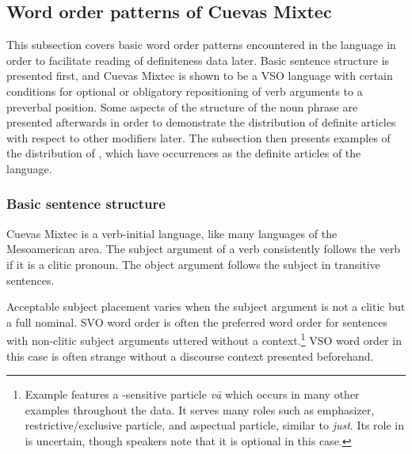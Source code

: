 \documentclass[output=paper,modfonts,nonflat]{langsci/langscibook}
\begin{document}
\subsection{Word order patterns of Cuevas Mixtec} \label{sec:cisneros:3.3}

This subsection covers basic word order patterns encountered in the language in order to facilitate reading of definiteness data later.  Basic sentence structure is presented first, and Cuevas Mixtec is shown to be a VSO language with certain conditions for optional or obligatory repositioning of verb arguments to a preverbal position.  Some aspects of the structure of the noun phrase are presented afterwards in order to demonstrate the distribution of definite articles with respect to other modifiers later.  The subsection then presents examples of the distribution of , which have occurrences as the definite articles of the language.

\subsubsection{Basic sentence structure} \label{sec:cisneros:3.3.1}

Cuevas Mixtec is a verb-initial language, like many languages of the Mesoamerican area.  The subject argument of a verb consistently follows the verb if it is a clitic pronoun.  The object argument follows the subject in transitive sentences.
 
\z 

\z 

Acceptable subject placement varies when the subject argument is not a clitic but a full nominal.  SVO word order is often the preferred word order for sentences with non-clitic subject arguments uttered without a  context.\footnote{Example  features a -sensitive particle \textit{v\=a} which occurs in many other examples throughout the data.  It serves many roles such as emphasizer, restrictive/exclusive particle, and aspectual particle, similar to  \textit{just}.  Its role in  is uncertain, though speakers note that it is optional in this case.}  VSO word order in this case is often strange without a discourse context presented beforehand.
\end{document}
